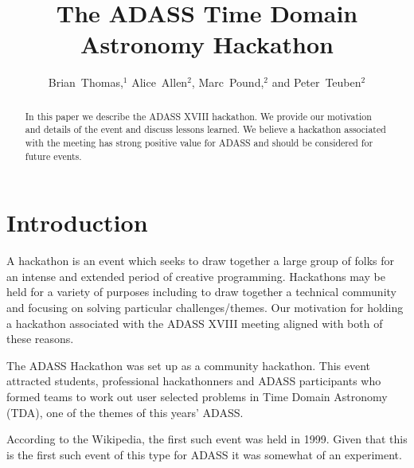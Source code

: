 \documentclass[11pt,twoside]{article}
\begin{document}
\title{The ADASS Time Domain Astronomy Hackathon}
\author{Brian~Thomas,$^1$ Alice~Allen$^2$, Marc~Pound,$^2$ and Peter~Teuben$^2$}





\begin{abstract}
In this paper we describe the ADASS XVIII hackathon. We provide our
motivation and details of the event and discuss lessons learned. We believe
a hackathon associated with the meeting has strong positive value for ADASS
and should be considered for future events.
\end{abstract}

\section{Introduction}

A hackathon is an event which seeks to draw together a large group of folks for an intense and extended period of creative programming.
Hackathons may be held for a variety of purposes including to draw together a technical community and focusing on solving particular challenges/themes. Our motivation for holding a hackathon associated with the ADASS XVIII meeting aligned with both of these reasons.

The ADASS Hackathon was set up as a community hackathon.  This event attracted students, professional hackathonners and ADASS participants who formed teams to work out user selected problems in Time Domain Astronomy (TDA), one of the themes of this years' ADASS.

According to the Wikipedia, the first such event was held in 1999\cite{}. 
Given that this is the first such event of this type for ADASS it was somewhat of an experiment.
\end{document}
